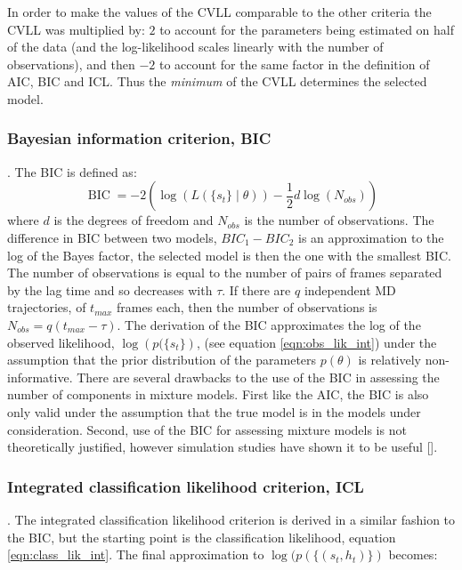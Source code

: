 In order to make the values of the CVLL comparable to the other criteria the CVLL was multiplied by: $2$ to account for the parameters being estimated on half of the data (and the log-likelihood scales linearly with the number of observations), and then $-2$ to account for the same factor in the definition of AIC, BIC and ICL. Thus the \emph{minimum} of the CVLL determines the selected model.  

\subsubsection{Bayesian information criterion, BIC}. 
The BIC is defined as: 
\begin{equation}\label{eqn:bic}
    \operatorname{BIC} = -2\left(\log{\left(L\left(\{s_t\}\middle|\theta\right)\right)} - \frac{1}{2}d\log{\left(N_{obs}\right)}\right)
\end{equation}
where $d$ is the degrees of freedom and $N_{obs}$ is the number of observations.  The difference in BIC between two models, $BIC_{1}-BIC_{2}$ is an approximation to the log of the Bayes factor, the selected model is then the one with the smallest BIC. The number of observations is equal to the number of pairs of frames separated by the lag time and so decreases with $\tau$. If there are $q$ independent MD trajectories, of $t_{max}$ frames each, then the number of observations is $N_{obs} = q(t_{max}-\tau)$. The derivation of the BIC approximates the log of the observed likelihood,  $\log{\left(p(\{s_t\}\right)}$, (see equation \ref{eqn:obs_lik_int}) under the assumption that the prior distribution of the parameters $p(\theta)$ is relatively non-informative. There are several drawbacks to the use of the BIC in assessing the number of components in mixture models. First like the AIC, the BIC is also only valid under the assumption that the true model is in the models under consideration. Second,  use of the BIC for assessing mixture models  is not theoretically justified, however simulation studies have shown it to be useful [].  

\subsubsection{Integrated classification likelihood criterion, ICL}. 
The integrated classification likelihood criterion is derived in a  similar fashion to the BIC, but the starting point is the classification likelihood, equation \ref{eqn:class_lik_int}. The final approximation to $\log{(p(\{(s_t, h_t)\})}$ becomes: 

